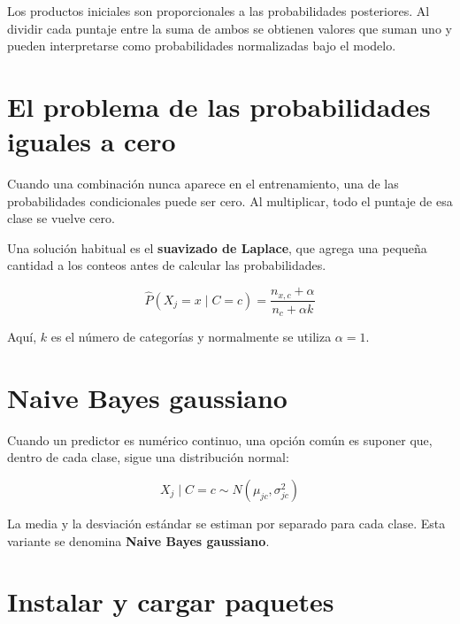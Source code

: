 \documentclass[
  spanish,
  10.5pt,
  letterpaper,
  openany,
  headings=big]{scrbook}
\begin{document}
\begin{tcolorbox}[enhanced jigsaw, arc=.35mm, bottomrule=.15mm, bottomtitle=1mm, breakable, colback=white, colbacktitle=quarto-callout-note-color!10!white, colframe=quarto-callout-note-color-frame, coltitle=black, left=2mm, leftrule=.75mm, opacityback=0, opacitybacktitle=0.6, rightrule=.15mm, title=\textcolor{quarto-callout-note-color}{\faInfo}\hspace{0.5em}{Interpretación}, titlerule=0mm, toprule=.15mm, toptitle=1mm]

Los productos iniciales son proporcionales a las probabilidades
posteriores. Al dividir cada puntaje entre la suma de ambos se obtienen
valores que suman uno y pueden interpretarse como probabilidades
normalizadas bajo el modelo.

\end{tcolorbox}

\section{El problema de las probabilidades iguales a
cero}\label{el-problema-de-las-probabilidades-iguales-a-cero}

Cuando una combinación nunca aparece en el entrenamiento, una de las
probabilidades condicionales puede ser cero. Al multiplicar, todo el
puntaje de esa clase se vuelve cero.

Una solución habitual es el \textbf{suavizado de Laplace}, que agrega
una pequeña cantidad a los conteos antes de calcular las probabilidades.

\[
\widehat{P}(X_j=x\mid C=c)
=\frac{n_{x,c}+\alpha}{n_c+\alpha k}
\]

Aquí, \(k\) es el número de categorías y normalmente se utiliza
\(\alpha=1\).

\section{Naive Bayes gaussiano}\label{naive-bayes-gaussiano}

Cuando un predictor es numérico continuo, una opción común es suponer
que, dentro de cada clase, sigue una distribución normal:

\[
X_j\mid C=c\sim N(\mu_{jc},\sigma_{jc}^{2})
\]

La media y la desviación estándar se estiman por separado para cada
clase. Esta variante se denomina \textbf{Naive Bayes gaussiano}.

\section{Instalar y cargar paquetes}\label{instalar-y-cargar-paquetes}
\end{document}
